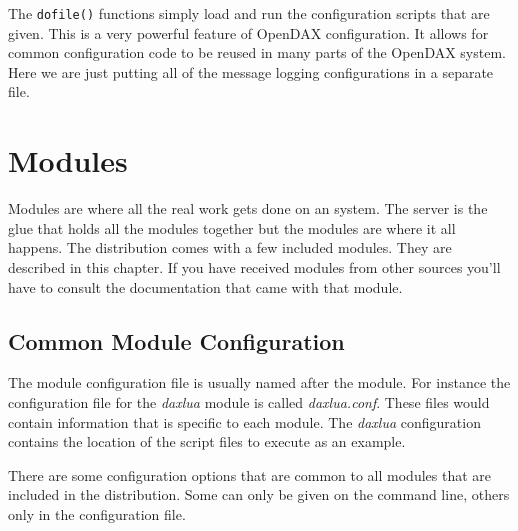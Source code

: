 The \texttt{dofile()} functions simply load and run the configuration scripts that are given.  This is a very powerful feature of OpenDAX configuration.  It allows for common configuration code to be reused in many parts of the OpenDAX system.  Here we are just putting all of the message logging configurations in a
separate file.

\chapter{Modules}
Modules are where all the real work gets done on an \opendax system.  The server is the glue that holds all the modules together but the modules are where it all happens.  The \opendax distribution comes with a few included modules.  They are described in this chapter.  If you have received modules from other sources you'll have to consult the documentation that came with that module.

\section{Common Module Configuration}

The module configuration file is usually named after the module.  For instance the configuration file for the \emph{daxlua} module is called \emph{daxlua.conf}.  These files would contain information that is specific to each module.  The \emph{daxlua} configuration contains the location of the script files to execute as an example.

There are some configuration options that are common to all modules that are included in the distribution.  Some can only be given on the command line, others only in the configuration file.

